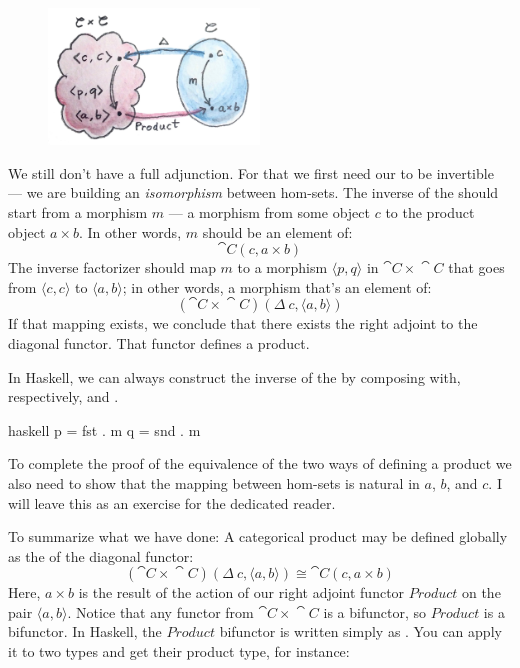 \begin{figure}[H]
  \centering
  \includegraphics[width=0.5\textwidth]{images/adj-product.jpg}
\end{figure}

\noindent
We still don't have a full adjunction. For that we first need our
 to be invertible --- we are building an
\emph{isomorphism} between hom-sets. The inverse of the
 should start from a morphism $m$ --- a
morphism from some object $c$ to the product object $a\times{}b$.
In other words, $m$ should be an element of:
\[\cat{C}(c, a\times{}b)\]
The inverse factorizer should map $m$ to a morphism
$\langle p, q \rangle$ in $\cat{C}\times{}\cat{C}$ that goes from
$\langle c, c \rangle$ to
$\langle a, b \rangle$; in other words, a morphism
that's an element of:
\[(\cat{C}\times{}\cat{C})(\Delta\ c, \langle a, b \rangle)\]
If that mapping exists, we conclude that there exists the right adjoint
to the diagonal functor. That functor defines a product.

In Haskell, we can always construct the inverse of the
 by composing  with, respectively,
 and .

\begin{snip}{haskell}
p = fst . m
q = snd . m
\end{snip}
To complete the proof of the equivalence of the two ways of defining a
product we also need to show that the mapping between hom-sets is
natural in $a$, $b$, and $c$. I will leave this as
an exercise for the dedicated reader.

To summarize what we have done: A categorical product may be defined
globally as the  of the diagonal functor:
\[(\cat{C}\times{}\cat{C})(\Delta\ c, \langle a, b \rangle) \cong \cat{C}(c, a\times{}b)\]
Here, $a\times{}b$ is the result of the action of our right adjoint
functor $Product$ on the pair
$\langle a, b \rangle$. Notice that any functor from
$\cat{C}\times{}\cat{C}$ is a bifunctor, so $Product$ is a bifunctor. In
Haskell, the $Product$ bifunctor is written simply as
\code{(,)}. You can apply it to two types and get their product type,
for instance:


